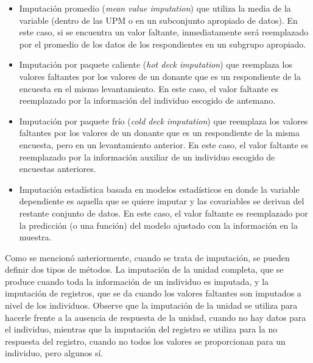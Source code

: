 \documentclass[
  12pt,
]{book}
\providecommand{\tightlist}{%
  \setlength{\itemsep}{0pt}\setlength{\parskip}{0pt}}
\begin{document}
\begin{itemize}
\tightlist
\item
  Imputación promedio (\emph{mean value imputation}) que utiliza la media de la variable (dentro de las UPM o en un subconjunto apropiado de datos). En este caso, si se encuentra un valor faltante, inmediatamente será reemplazado por el promedio de los datos de los respondientes en un subgrupo apropiado.
\item
  Imputación por paquete caliente (\emph{hot deck imputation}) que reemplaza los valores faltantes por los valores de un donante que es un respondiente de la encuesta en el mismo levantamiento. En este caso, el valor faltante es reemplazado por la información del individuo escogido de antemano.
\item
  Imputación por paquete frío (\emph{cold deck imputation}) que reemplaza los valores faltantes por los valores de un donante que es un respondiente de la misma encuesta, pero en un levantamiento anterior. En este caso, el valor faltante es reemplazado por la información auxiliar de un individuo escogido de encuestas anteriores.
\item
  Imputación estadística basada en modelos estadísticos en donde la variable dependiente es aquella que se quiere imputar y las covariables se derivan del restante conjunto de datos. En este caso, el valor faltante es reemplazado por la predicción (o una función) del modelo ajustado con la información en la muestra.
\end{itemize}

Como se mencionó anteriormente, cuando se trata de imputación, se pueden definir dos tipos de métodos. La imputación de la unidad completa, que se produce cuando toda la información de un individuo es imputada, y la imputación de registros, que se da cuando los valores faltantes son imputados a nivel de los individuos. Observe que la imputación de la unidad se utiliza para hacerle frente a la ausencia de respuesta de la unidad, cuando no hay datos para el individuo, mientras que la imputación del registro se utiliza para la no respuesta del registro, cuando no todos los valores se proporcionan para un individuo, pero algunos sí.
\end{document}
